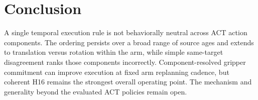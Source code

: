 \section{Conclusion}
\label{sec:conclusion}

A single temporal execution rule is not behaviorally neutral across ACT action
components. The ordering persists over a broad range of source ages and extends
to translation versus rotation within the arm, while simple same-target
disagreement ranks those components incorrectly. Component-resolved gripper
commitment can improve execution at fixed arm replanning cadence, but coherent
H16 remains the strongest overall operating point. The mechanism and
generality beyond the evaluated ACT policies remain open.
